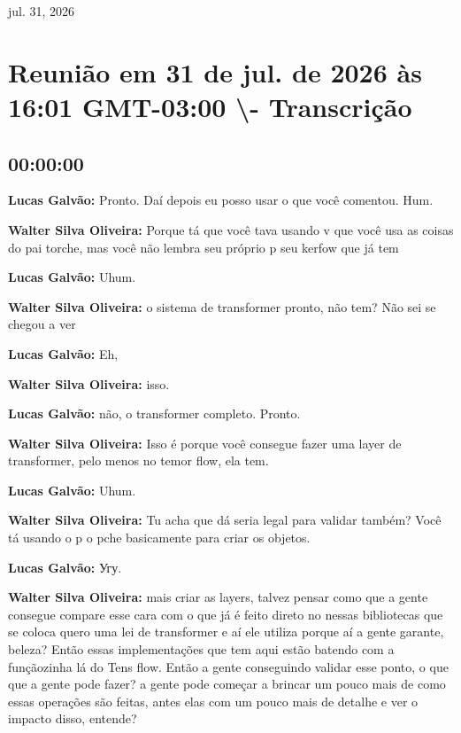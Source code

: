 jul. 31, 2026



\section{\textbf{Reunião em 31 de jul. de 2026 às 16:01 GMT-03:00 \textbackslash{}- Transcrição}}



\subsection{\textbf{00:00:00}}



\textbf{Lucas Galvão:} Pronto. Daí depois eu posso usar o que você comentou. Hum.



\textbf{Walter Silva Oliveira:} Porque tá que você tava usando v que você usa as coisas do pai torche, mas você não lembra seu próprio p seu kerfow que já tem



\textbf{Lucas Galvão:} Uhum.



\textbf{Walter Silva Oliveira:} o sistema de transformer pronto, não tem? Não sei se chegou a ver



\textbf{Lucas Galvão:} Eh,



\textbf{Walter Silva Oliveira:} isso.



\textbf{Lucas Galvão:} não, o transformer completo. Pronto.



\textbf{Walter Silva Oliveira:} Isso é porque você consegue fazer uma layer de transformer, pelo menos no temor flow, ela tem.



\textbf{Lucas Galvão:} Uhum.



\textbf{Walter Silva Oliveira:} Tu acha que dá seria legal para validar também? Você tá usando o p o pche basicamente para criar os objetos.



\textbf{Lucas Galvão:} Угу.



\textbf{Walter Silva Oliveira:} mais criar as layers, talvez pensar como que a gente consegue compare esse cara com o que já é feito direto no nessas bibliotecas que se coloca quero uma lei de transformer e aí ele utiliza porque aí a gente garante, beleza? Então essas implementações que tem aqui estão batendo com a funçãozinha lá do Tens flow. Então a gente conseguindo validar esse ponto, o que que a gente pode fazer? a gente pode começar a brincar um pouco mais de como essas operações são feitas, antes elas com um pouco mais de detalhe e ver o impacto disso, entende?




